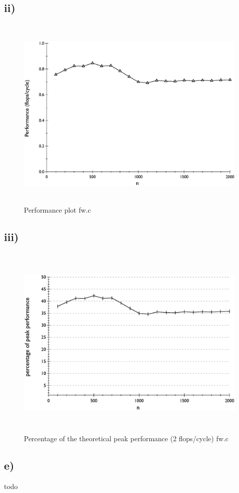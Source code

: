 \documentclass[10pt,a4paper,oneside,notitlepage]{report}
\begin{document}
\subsection*{ii)}
\begin{figure}[H]
\caption{Performance plot fw.c}
\includegraphics[height=9.5cm]{fw_performance}
\end{figure}
\subsection*{iii)}
\begin{figure}[H]
\caption{Percentage of the theoretical peak performance (2 flops/cycle) fw.c}
\includegraphics[height=9.5cm]{fw_percentage_of_peak}
\end{figure}
\subsection*{e)}
todo
\end{document}

